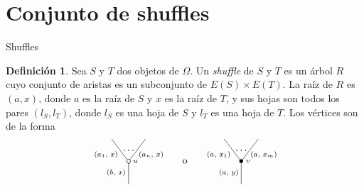 \documentclass[12pt,aspectratio=169]{beamer}
\numberwithin{equation}{section}
\theoremstyle{definition}
\newtheorem{defi}[teo]{Definici\'on}
\begin{document}
{%
\section{Conjunto de shuffles}

\begin{frame}{Shuffles}
    \begin{defi}
        Sea $S$ y $T$ dos objetos de $\Omega$. Un \emph{shuffle} de $S$ y $T$ es un \'arbol $R$ cuyo conjunto de aristas es un subconjunto de $E(S)\times E(T)$. La ra\'iz de $R$ es $(a,x)$, donde $a$ es la ra\'iz de $S$ y $x$ es la ra\'iz de $T$,
        y sus hojas son todos los pares $(l_S,l_T)$, donde $l_S$ es una hoja de $S$ y $l_T$ es una hoja de $T$. Los v\'ertices son de la forma
        $$
            \xy
            <0.08cm, 0cm>:
            (0.0, 0.0)*{}="1"; %
            (0.0, 10.0)*\cir<2pt>{}="2"; %
            (-7.5, 20.0)*{}="3"; %
            (7.5, 20.0)*{}="4"; %
            "1";"2" **\dir{-};
            "2";"3" **\dir{-};
            "2";"4" **\dir{-};
            (3.0, 10.0)*=0{\scriptstyle u};
            (-5.5, 5)*=0{\scriptstyle (b,\text{ }x)};
            (-10, 13.0)*=0{\scriptstyle (a_1,\text{ }x)};
            (10, 13.0)*=0{\scriptstyle (a_n,\text{ }x)};
            (0,15)*{\dots};
            \endxy
            \xy
            <0.08cm, 0cm>:
            (-15, 0.0)*{}="1";
            (15, 10.0)*{}="2";
            (0,10)*{\rm o};
            \endxy
            \xy
            <0.08cm, 0cm>:
            (0.0, 0.0)*{}="1"; %
            (0.0, 10.0)*=0{\bullet}="2"; %
            (-7.5, 20.0)*{}="3"; %
            (7.5, 20.0)*{}="4"; %
            "1";"2" **\dir{-};
            "2";"3" **\dir{-};
            "2";"4" **\dir{-};
            (3.0, 10.0)*=0{\scriptstyle v};
            (-5.5, 5)*=0{\scriptstyle (a,\text{ }y)};
            (-10, 13.0)*=0{\scriptstyle (a,\text{ }x_1)};
            (10, 13.0)*=0{\scriptstyle (a,\text{ }x_m)};
            (0,15)*{\dots};
            \endxy
        $$


\end{defi}
\end{frame}}
\end{document}
